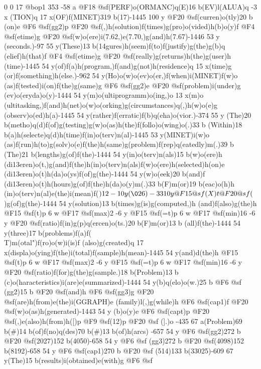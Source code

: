 {{{{{{{{{{{{{{{{{{{{{{{{{{{{{{{{{{{{{{{{{{{{{{{{{{{{{{{{{{{{{{{{{{{{{{{{{{{{{{{{{{{{{{{{{{{{{{{{{{{{{0 0 17 @bop1 353 -58 a @F18 @sf(PERF)o(ORMANC)q(E)16 b(EV)l(ALUA)q -3 x
(TION)q 17 x(OF)f(MINET)319 b(17)-1445 100 y @F20 @sf(curren)o(tly)20 b
(on)e @F6 @sf(gg2)p @F20 @sf(,)h(solution)f(times)g(pro)o(vided)h(b)o(y)f 
@F4 @sf(etime)g @F20 @sf(w)o(ere)i(7.62,)e(7.70,)g(and)h(7.67)-1446 53 y
(seconds.)-97 55 y(These)13 b(\014gures)h(seem)f(to)f(justify)g(the)g(b)q
(elief)h(that)f @F4 @sf(etime)g @F20 @sf(really)g(returns)h(the)g(user)h
(time)-1445 54 y(of)f(a)h(program,)f(and)g(not)h(residence)q 15 x(time)g
(or)f(something)h(else.)-962 54 y(Ho)o(w)o(ev)o(er,)f(when)i(MINET)f(w)o
(as)f(tested)i(on)f(the)g(same)g @F6 @sf(gg2)e @F20 @sf(problem)i(under)g
(ev)o(eryda)o(y)-1444 54 y(m)o(ultiprogramm)o(ing,)o 13 x(m)o
(ultitasking,)f(and)h(net)o(w)o(orking)g(circumstances)q(,)h(w)o(e)g
(observ)o(ed)h(a)-1445 54 y(rather)f(erratic)f(b)q(eha)o(vior.)-374 55 y
(The)20 b(metho)q(d)f(of)g(testing)g(w)o(as)h(the)f(follo)o(wing)o(.)33 b
(Within)18 b(a)h(selecte)q(d)h(time)f(in)o(terv)n(al)-1445 53 y(MINET)i(w)o
(as)f(run)h(to)g(solv)o(e)f(the)h(same)g(problem)f(rep)q(eatedly)m(.)39 b
(The)21 b(lengths)g(of)f(the)-1444 54 y(in)o(terv)n(als)15 b(w)o(ere)h
(di\013eren)o(t,)g(and)f(the)h(in)o(terv)n(als)f(w)o(ere)h(selected)h(on)e
(di\013eren)o(t)h(da)o(ys)f(of)g(the)-1444 54 y(w)o(eek)20 b(and)f
(di\013eren)o(t)h(hours)g(of)f(the)h(da)o(y)m(.)33 b(F)m(or)19 b(eac)o(h)h
(in)o(terv)n(al)e(the)i(mean)f(\()12 -10 y(\026)-33 10 y @F15 @sf(X)t 
@F20 @sf(\))g(of)g(the)-1444 54 y(solution)13 b(times)g(is)g(computed,)h
(and)f(also)g(the)h @F15 @sf(t)p 6 w @F17 @sf(max)2 -6 y @F15 @sf(=t)p 6 w 
@F17 @sf(min)16 -6 y @F20 @sf(ratio)f(in)g(p)q(ercen)o(ts.)20 b(F)m(or)13 b
(all)f(the)-1444 54 y(three)17 b(problems)f(a)f(\\T)m(otal")f(ro)o(w)i(is)f
(also)g(created)q 17 x(displa)o(ying)f(the)i(total)f(sample)h(mean)-1445 
54 y(and)d(the)h @F15 @sf(t)p 6 w @F17 @sf(max)2 -6 y @F15 @sf(=t)p 6 w 
@F17 @sf(min)16 -6 y @F20 @sf(ratio)f(for)g(the)g(sample.)18 b(Problem)13 b
(c)o(haracteristics)i(are)e(summarized)-1444 54 y(b)q(elo)o(w.)25 b @F6 @sf
(gg2)15 b @F20 @sf(and)h @F6 @sf(gg3)g @F20 @sf(are)h(from)e(the)i(GGRAPH)e
(family)l(,)g(while)h @F6 @sf(cap1)f @F20 @sf(w)o(as)h(generated)-1443 54 y
(b)o(y)e @F6 @sf(capt)p @F20 @sf(,)e(also)h(from)h([)p @F9 @sf(12)p @F20 @sf
(].)o -435 67 a(Problem)69 b(#)14 b(of)f(no)q(des)70 b(#)13 b(of)h(arcs)
-657 54 y @F6 @sf(gg2)272 b @F20 @sf(2027)152 b(4050)-658 54 y @F6 @sf
(gg3)272 b @F20 @sf(4098)152 b(8192)-658 54 y @F6 @sf(cap1)270 b @F20 @sf
(514)133 b(33025)-609 67 y(The)15 b(results)i(obtained)e(with)g @F6 @sf
}}}}}}}}}}}}}}}}}}}}}}}}}}}}}}}}}}}}}}}}}}}}}}}}}}}}}}}}}}}}}}}}}}}}}}}}}}}}}}}}}}}}}}}}}}}}}}}}}}}}}
